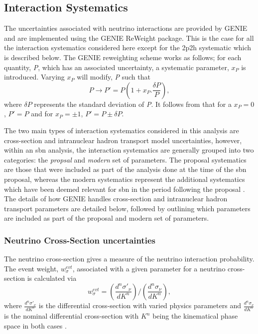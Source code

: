 \subsection{Interaction Systematics}\label{sec:interaction_syst}
The uncertainties associated with neutrino interactions are provided by GENIE and are implemented using the GENIE ReWeight package. This is the case for all the interaction systematics considered here except for the \gls{2p2h} systematic which is described below. The GENIE reweighting scheme works as follows; for each quantity, \textit{P}, which has an associated uncertainty, a systematic parameter, $x_P$ is introduced. Varying $x_P$ will modify, \textit{P} such that
\begin{equation}
    P \rightarrow P' = P (1 + x_P . \frac{\delta P}{P}),
\label{eqn:genie_reweight}
\end{equation}
where $\delta P$ represents the standard deviation of \textit{P}. It follows from  that for a $x_P = 0$, $P' = P$ and for $x_P = \pm 1$, $P' = P \pm \delta P$.

The two main types of interaction systematics considered in this analysis are cross-section and intranuclear hadron transport model uncertainties, however, within an \gls{sbn} analysis, the interaction systematics are generally grouped into two categories: the \textit{propsal} and \textit{modern} set of parameters. The proposal systematics are those that were included as part of the analysis done at the time of the \gls{sbn} proposal, whereas the modern systematics represent the additional systematics which have been deemed relevant for \gls{sbn} in the period following the proposal \cite{SBN_Proposal}. The details of how GENIE handles cross-section and intranuclear hadron transport parameters are detailed below, followed by outlining which parameters are included as part of the proposal and modern set of parameters.

\subsubsection*{Neutrino Cross-Section uncertainties}

The neutrino cross-section gives a measure of the neutrino interaction probability. The event weight, $w_{\sigma}^{evt}$, associated with a given parameter for a neutrino cross-section is calculated via
\begin{equation}
    w_\sigma^{evt} = \left(\frac{d^n\sigma'_\nu}{dK^n}\right)\Bigg/\left(\frac{d^n\sigma_\nu}{dK^n}\right),
\end{equation}
where $\frac{d^n\sigma'_\nu}{dK^n}$ is the differential cross-section with varied physics parameters and  $\frac{d^n\sigma_\nu}{dK^n}$ is the nominal differential cross-section with $K^n$ being the kinematical phase space in both cases \cite{GENIE_manual}.

